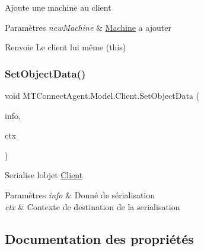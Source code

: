 Ajoute une machine au client 


\begin{DoxyParams}{Paramètres}
{\em new\+Machine} & \mbox{\hyperlink{class_m_t_connect_agent_1_1_model_1_1_machine}{Machine}} a ajouter\\
\hline
\end{DoxyParams}
\begin{DoxyReturn}{Renvoie}
Le client lui même (this)
\end{DoxyReturn}
\mbox{\label{class_m_t_connect_agent_1_1_model_1_1_client_a707b7a8486e7ee79d9986f6aa1729f4e}} 
\subsubsection{\texorpdfstring{Set\+Object\+Data()}{SetObjectData()}}
{\footnotesize\ttfamily void M\+T\+Connect\+Agent.\+Model.\+Client.\+Set\+Object\+Data (\begin{DoxyParamCaption}\item[{Serialization\+Info}]{info,  }\item[{Streaming\+Context}]{ctx }\end{DoxyParamCaption})\hspace{0.3cm}{\ttfamily [inline]}}



Serialise l\textquotesingle{}objet \mbox{\hyperlink{class_m_t_connect_agent_1_1_model_1_1_client}{Client}} 


\begin{DoxyParams}{Paramètres}
{\em info} & Donné de sérialisation\\
\hline
{\em ctx} & Contexte de destination de la serialisation\\
\hline
\end{DoxyParams}


\subsection{Documentation des propriétés}
\mbox{\label{class_m_t_connect_agent_1_1_model_1_1_client_a99571f570e22af5b1555ad37c2aa6d06}} 
